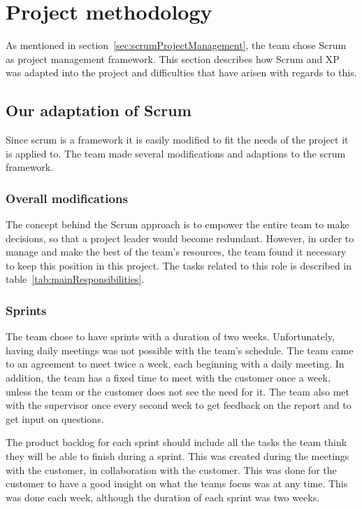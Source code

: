 \newpage
\section{Project methodology}

\label{sec:scrumDevProcess}
As mentioned in section~\ref{sec:scrumProjectManagement}, the team chose Scrum as project management framework. This section describes how Scrum and XP was adapted into the project and difficulties that have arisen with regards to this.

\subsection{Our adaptation of Scrum}
Since scrum is a framework it is easily modified to fit the needs of the project it is applied to. The team made several modifications and adaptions to the scrum framework. 

\subsubsection{Overall modifications}
The concept behind the Scrum approach is to empower the entire team to make decisions, so that a project leader would become redundant. However, in order to manage and make the best of the team's resources, the team found it necessary to keep this position in this project. The tasks related to this role is described in table~\ref{tab:mainResponsibilities}.

\subsubsection{Sprints}
The team chose to have sprints with a duration of two weeks. Unfortunately, having daily meetings was not possible with the team's schedule. The team came to an agreement to meet twice a week, each beginning with a daily meeting. In addition, the team has a fixed time to meet with the customer once a week, unless the team or the customer does not see the need for it. The team also met with the supervisor once every second week to get feedback on the report and to get input on questions.

The product backlog for each sprint should include all the tasks the team think they will be able to finish during a sprint. This was created during the meetings with the customer, in collaboration with the customer. This was done for the customer to have a good insight on what the teams focus was at any time. This was done each week, although the duration of each sprint was two weeks.

